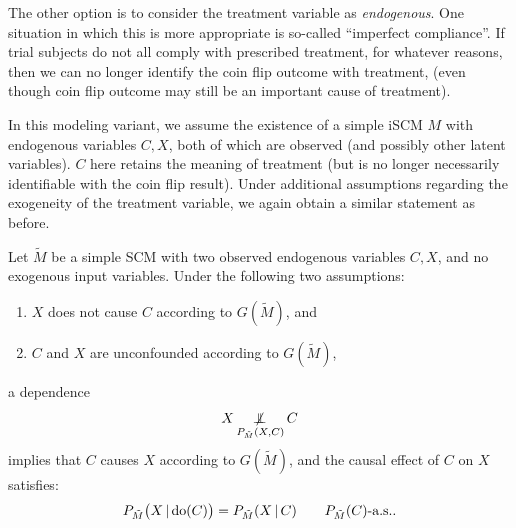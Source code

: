 The other option is to consider the treatment variable as \emph{endogenous}.
One situation in which this is more appropriate is so-called ``imperfect compliance''.
If trial subjects do not all comply with prescribed treatment, for whatever reasons, 
then we can no longer identify the coin flip outcome with treatment,
(even though coin flip outcome may still be an important cause of treatment). 

In this modeling variant, we assume the existence of a simple iSCM $M$
with endogenous variables $C, X$, both of which are observed (and possibly other
latent variables). $C$ here retains the meaning
of treatment (but is no longer necessarily identifiable with the coin
flip result).
Under additional assumptions regarding the exogeneity of the treatment variable,
we again obtain a similar statement as before.
\begin{Prp}\label{prp:RCT3}
Let $\tilde{M}$ be a simple SCM with two observed endogenous variables $C, X$,
and no exogenous input variables.
Under the following two assumptions:
  \begin{enumerate}
    \item $X$ does not cause $C$ according to $G(\tilde{M})$, and
    \item $C$ and $X$ are unconfounded according to $G(\tilde{M})$,
  \end{enumerate}
a dependence 
  \begin{equation}\label{eq:RCT_CI_statement3}
    X \operatorname*{\not\mkern-2mu\perp\mkern-11mu\perp}_{P_{\tilde{M}}(X,C)} C
  \end{equation}
  implies that $C$ causes $X$ according to $G(\tilde{M})$, and the causal effect of $C$ on $X$ satisfies:
  \begin{equation}\label{eq:RCT_causal_effect3}
    P_{\tilde{M}}\big(X \operatorname*{|} \operatorname{do}(C)\big) = P_{\tilde{M}}(X \operatorname*{|} C) \qquad P_{\tilde{M}}(C)\text{-a.s.}.
  \end{equation}
\end{Prp}
